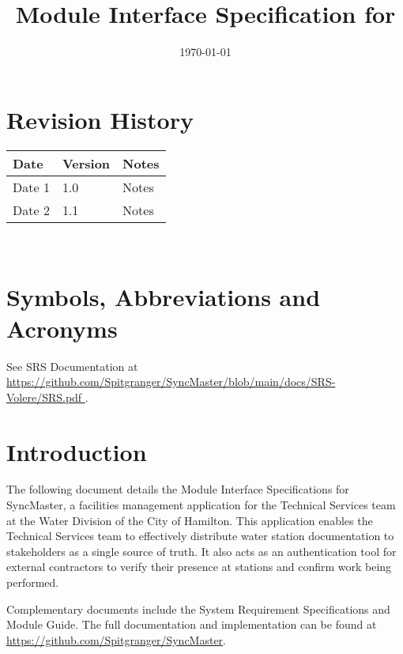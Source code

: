 \documentclass[12pt, titlepage]{article}
\begin{document}
\title{Module Interface Specification for \progname{}}

\author{\authname}

\date{\today}

\maketitle


\section{Revision History}

\begin{tabularx}{\textwidth}{p{3cm}p{2cm}X}
  \toprule {\bf Date} & {\bf Version} & {\bf Notes}\\
  \midrule
  Date 1 & 1.0 & Notes\\
  Date 2 & 1.1 & Notes\\
  \bottomrule
\end{tabularx}

~\newpage

\section{Symbols, Abbreviations and Acronyms}

See SRS Documentation at
\url{https://github.com/Spitgranger/SyncMaster/blob/main/docs/SRS-Volere/SRS.pdf
}.

\newpage

\tableofcontents

\newpage


\section{Introduction}

The following document details the Module Interface Specifications for
SyncMaster, a facilities management application for the Technical
Services team at the Water Division of the City of Hamilton.
This application enables the Technical Services team to effectively distribute
water station documentation to stakeholders as a single source of
truth. It also acts as an authentication tool for external
contractors to verify their presence at stations and confirm work
being performed.

Complementary documents include the System Requirement Specifications
and Module Guide.  The full documentation and implementation can be
found at \url{https://github.com/Spitgranger/SyncMaster}.
\end{document}

